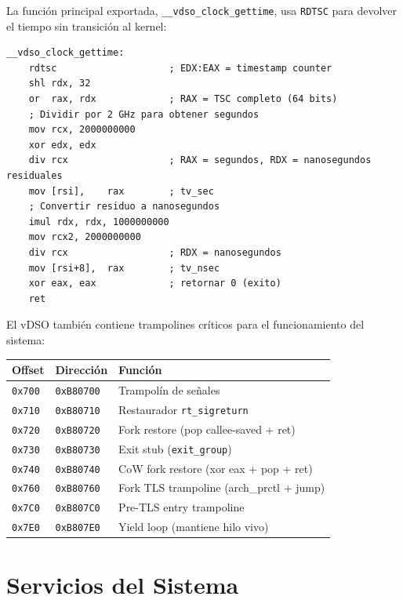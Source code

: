 \documentclass[11pt,twoside,openright]{book}
\theoremstyle{definition}
\theoremstyle{plain}
\theoremstyle{remark}
\begin{document}
La función principal exportada, \texttt{\_\_vdso\_clock\_gettime}, usa \texttt{RDTSC}
para devolver el tiempo sin transición al kernel:

\begin{lstlisting}[language={[x86masm]Assembler},caption={Implementación de \texttt{\_\_vdso\_clock\_gettime} en el vDSO.},label={lst:vdso-clock}]
__vdso_clock_gettime:
    rdtsc                    ; EDX:EAX = timestamp counter
    shl rdx, 32
    or  rax, rdx             ; RAX = TSC completo (64 bits)
    ; Dividir por 2 GHz para obtener segundos
    mov rcx, 2000000000
    xor edx, edx
    div rcx                  ; RAX = segundos, RDX = nanosegundos residuales
    mov [rsi],    rax        ; tv_sec
    ; Convertir residuo a nanosegundos
    imul rdx, rdx, 1000000000
    mov rcx2, 2000000000
    div rcx                  ; RDX = nanosegundos
    mov [rsi+8],  rax        ; tv_nsec
    xor eax, eax             ; retornar 0 (exito)
    ret
\end{lstlisting}

El vDSO también contiene trampolines críticos para el funcionamiento del sistema:

\begin{center}
\begin{tabular}{@{}lll@{}}
\toprule
\textbf{Offset} & \textbf{Dirección} & \textbf{Función} \\
\midrule
\texttt{0x700} & \texttt{0xB80700} & Trampolín de señales \\
\texttt{0x710} & \texttt{0xB80710} & Restaurador \texttt{rt\_sigreturn} \\
\texttt{0x720} & \texttt{0xB80720} & Fork restore (pop callee-saved + ret) \\
\texttt{0x730} & \texttt{0xB80730} & Exit stub (\texttt{exit\_group}) \\
\texttt{0x740} & \texttt{0xB80740} & CoW fork restore (xor eax + pop + ret) \\
\texttt{0x760} & \texttt{0xB80760} & Fork TLS trampoline (arch\_prctl + jump) \\
\texttt{0x7C0} & \texttt{0xB807C0} & Pre-TLS entry trampoline \\
\texttt{0x7E0} & \texttt{0xB807E0} & Yield loop (mantiene hilo vivo) \\
\bottomrule
\end{tabular}
\end{center}

\chapter{Servicios del Sistema}
\label{chap:servicios}
\end{document}
